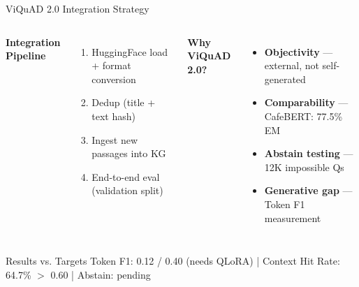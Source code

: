 \documentclass[aspectratio=169]{beamer}
\newcommand{\pos}[1]{\textcolor{positive}{#1}}
\begin{document}
\begin{frame}{ViQuAD 2.0 Integration Strategy}
\begin{columns}[T]
\textbf{Integration Pipeline}
\begin{enumerate}
  \item HuggingFace load + format conversion
  \item Dedup (title + text hash)
  \item Ingest new passages into KG
  \item End-to-end eval (validation split)
\end{enumerate}

\textbf{Why ViQuAD 2.0?}
\begin{itemize}
  \item \textbf{Objectivity} --- external, not self-generated
  \item \textbf{Comparability} --- CafeBERT: 77.5\% EM
  \item \textbf{Abstain testing} --- 12K impossible Qs
  \item \textbf{Generative gap} --- Token F1 measurement
\end{itemize}
\end{columns}
\vspace{0.5em}
\begin{block}{Results vs. Targets}
Token F1: 0.12 / 0.40 (needs QLoRA) \quad | \quad \pos{Context Hit Rate: 64.7\% $>$ 0.60} \quad | \quad Abstain: pending
\end{block}
\end{frame}
\end{document}
